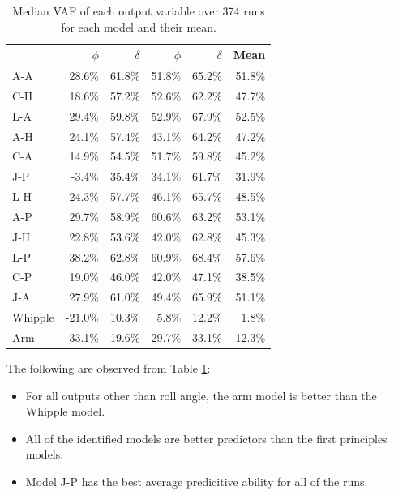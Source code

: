 \documentclass[a4paper]{article}
\begin{document}
\begin{table}
  \label{tab:MedianVAFOutputs}
  \caption{Median VAF of each output variable over 374 runs for each model
  and their mean.}
  \centering
  \begin{tabular}{lrrrrr}
            & $\phi$   & $\delta$ & $\dot{\phi}$ & $\dot{\delta}$ & Mean   \\
    \hline
    A-A     & 28.6\%   & 61.8\%   & 51.8\%      & 65.2\%          & 51.8\% \\
    C-H     & 18.6\%   & 57.2\%   & 52.6\%      & 62.2\%          & 47.7\% \\
    L-A     & 29.4\%   & 59.8\%   & 52.9\%      & 67.9\%          & 52.5\% \\
    A-H     & 24.1\%   & 57.4\%   & 43.1\%      & 64.2\%          & 47.2\% \\
    C-A     & 14.9\%   & 54.5\%   & 51.7\%      & 59.8\%          & 45.2\% \\
    J-P     & -3.4\%   & 35.4\%   & 34.1\%      & 61.7\%          & 31.9\% \\
    L-H     & 24.3\%   & 57.7\%   & 46.1\%      & 65.7\%          & 48.5\% \\
    A-P     & 29.7\%   & 58.9\%   & 60.6\%      & 63.2\%          & 53.1\% \\
    J-H     & 22.8\%   & 53.6\%   & 42.0\%      & 62.8\%          & 45.3\% \\
    L-P     & 38.2\%   & 62.8\%   & 60.9\%      & 68.4\%          & 57.6\% \\
    C-P     & 19.0\%   & 46.0\%   & 42.0\%      & 47.1\%          & 38.5\% \\
    J-A     & 27.9\%   & 61.0\%   & 49.4\%      & 65.9\%          & 51.1\% \\
    Whipple & -21.0\%  & 10.3\%   & 5.8\%       & 12.2\%          &  1.8\% \\
    Arm     & -33.1\%  & 19.6\%   & 29.7\%      & 33.1\%          & 12.3\% \\
  \end{tabular}
\end{table}

The following are observed from Table \ref{tab:MedianVAFOutputs}:

\begin{itemize}
  \item
    For all outputs other than roll angle, the arm model is better than
    the Whipple model.
  \item
    All of the identified models are better predictors than the first
    principles models.
  \item
    Model J-P has the best average predicitive ability for all of the runs.
\end{itemize}
\end{document}
